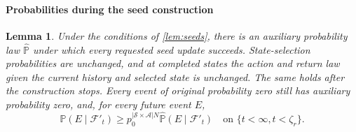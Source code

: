 \documentclass[twoside,11pt]{article}
\newtheorem{lemma}[lemma]{Lemma}
\DeclareRobustCommand{\reviewbarstart}{%
  \ifhmode %
    \vadjust{\vbox to 0pt{%
      \vskip-\ht\strutbox %
      \vskip-\dp\strutbox %
      \cbstart[\changebarwidth] %
      \vss %
    }}%
  \else %
    \cbstart[\changebarwidth]%
  \fi %
} %
\providecommand{\DIFadd}[1]{#1} %
\providecommand{\DIFaddbegin}{\reviewbarstart} %
\def\DIFadd#1{#1}%
\def\DIFaddbegin{}%
\begin{document}
\DIFaddbegin \paragraph{\DIFadd{Probabilities during the seed construction}}
\begin{lemma}
\label{lem:measure}
\DIFadd{Under the conditions of \autoref{lem:seeds}, there is an auxiliary probability law $\widehat{\mathbb P}$ under which every requested seed update succeeds. State-selection probabilities are unchanged, and at completed states the action and return law given the current history and selected state is unchanged. The same holds after the construction stops. Every event of original probability zero still has auxiliary probability zero, and, for every future event $E$,
}\[
\DIFadd{\mathbb P(E\mid\mathcal F'_t)
\ge p_0^{|\mathcal S\times\mathcal A|N}\widehat{\mathbb P}(E\mid\mathcal F'_t)
\quad\text{on }\{t<\infty,t<\zeta_r\}.
}\]
\end{lemma}
\end{document}
